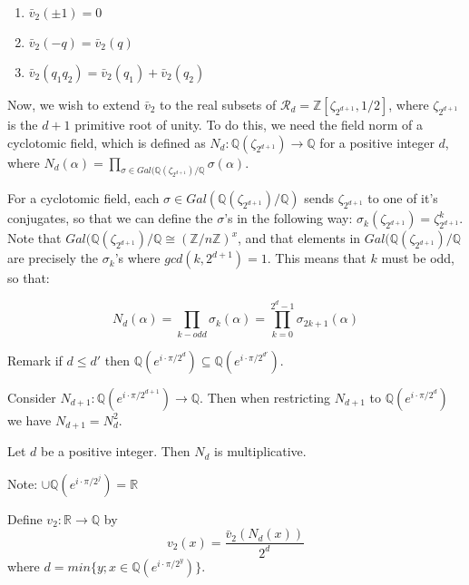 \documentclass[12pt]{dalthesis}
\begin{document}
\begin{proposition}
\begin{enumerate}
\item $\bar{v}_2(\pm 1) = 0$
\item $\bar{v}_2 (-q) = \bar{v}_2 (q)$
\item $\bar{v}_2(q_1q_2) = \bar{v}_2 (q_1) + \bar{v}_2 (q_2)$
\end{enumerate}
\end{proposition}

Now, we wish to extend $\bar{v}_2$ to the real subsets of $\mathcal{R}_d = \mathbb{Z}[\zeta_{2^{d+1}}, 1/2]$, where $\zeta_{2^{d+1}}$ is the $d+1$ primitive root of unity. To do this, we need the field norm of a cyclotomic field, which is defined as $N_d: \mathbb{Q}(\zeta_{2^{d+1}}) \longrightarrow \mathbb{Q}$ for a positive integer $d$, where $N_d (\alpha) = \prod_{\sigma \in Gal(\mathbb{Q}(\zeta_{2^{d+1}})/\mathbb{Q}} \sigma (\alpha)$. 

For a cyclotomic field, each $\sigma \in Gal(\mathbb{Q}(\zeta_{2^{d+1}})/\mathbb{Q})$ sends $\zeta_{2^{d+1}}$ to one of it's conjugates, so that we can define the $\sigma$'s in the following way: $\sigma_k (\zeta_{2^{d+1}}) = \zeta_{2^{d+1}}^k$. Note that $Gal(\mathbb{Q}(\zeta_{2^{d+1}})/\mathbb{Q} \cong (\mathbb{Z}/n\mathbb{Z})^x$, and that elements in $Gal(\mathbb{Q}(\zeta_{2^{d+1}})/\mathbb{Q}$ are precisely the $\sigma_k$'s where $gcd(k, 2^{d+1}) = 1$. This means that $k$ must be odd, so that:

\begin{equation}
N_d(\alpha) = \prod_{k-odd} \sigma_k (\alpha) = \prod_{k=0}^{2^d - 1} \sigma_{2k+1} (\alpha)
\end{equation}

Remark if $d \leq d'$ then $\mathbb{Q}(e^{i\cdot \pi / 2^d}) \subseteq \mathbb{Q}(e^{i\cdot \pi / 2^{d'}})$.

\begin{proposition}
Consider $N_{d+1}: \mathbb{Q}(e^{i\cdot \pi / 2^{d+1}}) \longrightarrow \mathbb{Q}$. Then when restricting $N_{d+1}$ to $\mathbb{Q}(e^{i\cdot \pi / 2^{d}})$ we have $N_{d+1} = N_d^2$.
\end{proposition}

\begin{proposition}
Let $d$ be a positive integer. Then $N_d$ is multiplicative.
\end{proposition}

Note: $\cup \mathbb{Q}(e^{i\cdot \pi / 2^{j}}) = \mathbb{R}$
\begin{definition}
Define $v_2: \mathbb{R} \longrightarrow \mathbb{Q}$ by 
\begin{equation}
v_2 (x) = \frac{\bar{v}_2 (N_d (x))}{2^d}
\end{equation}
where $d = min\{ y; x \in \mathbb{Q} (e^{i \cdot \pi / 2^y })\}$.
\end{definition}
\end{document}
